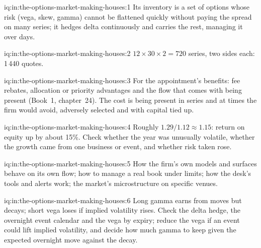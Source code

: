 \begin{solution}{iq:in:the-options-market-making-houses:1}
Its inventory is a set of options whose risk (vega, skew, gamma) cannot be flattened quickly without paying the spread
on many series; it hedges delta continuously and carries the rest, managing it over days.
\end{solution}

\begin{solution}{iq:in:the-options-market-making-houses:2}
$12\times30\times2=720$ series, two sides each: 1\,440 quotes.
\end{solution}

\begin{solution}{iq:in:the-options-market-making-houses:3}
For the appointment's benefits: fee rebates, allocation or priority advantages and the flow that comes with being
present (Book~1, chapter~24). The cost is being present in series and at times the firm would avoid, adversely selected
and with capital tied up.
\end{solution}

\begin{solution}{iq:in:the-options-market-making-houses:4}
Roughly $1.29/1.12\approx1.15$: return on equity up by about 15\%. Check whether the year was unusually volatile,
whether the growth came from one business or event, and whether risk taken rose.
\end{solution}

\begin{solution}{iq:in:the-options-market-making-houses:5}
How the firm's own models and surfaces behave on its own flow; how to manage a real book under limits; how the
desk's tools and alerts work; the market's microstructure on specific venues.
\end{solution}

\begin{solution}{iq:in:the-options-market-making-houses:6}
Long gamma earns from moves but decays; short vega loses if implied volatility rises. Check the delta hedge, the
overnight event calendar and the vega by expiry; reduce the vega if an event could lift implied volatility, and
decide how much gamma to keep given the expected overnight move against the decay.
\end{solution}
